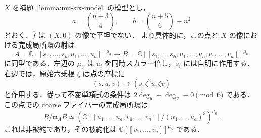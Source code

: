 \begin{theorem}
\label{thm:coarse-nonflat-degree-one}
$X$ を補題~\ref{lemma:mu-six-model} の模型とし，
\[
 a=\binom{n+3}{4},\qquad b=\binom{n+5}{6}-n^2
\]
とおく．$\overline f$ は $(X,0)$ の像で平坦でない．
より具体的に，この点と $X$ の像における完成局所環の射は
\begin{equation}
 A=\mathbb C[[s_1,\ldots,s_b,u_1,\ldots,u_a]]^{\mu_3}
 \longrightarrow
 B=\mathbb C[[s_1,\ldots,s_b,u_1,\ldots,u_a,v_1,\ldots,v_n]]^{\mu_6}
 \label{eq:coarse-nonflat-local}
\end{equation}
に同型である．左辺の $\mu_3$ は $u_i$ を同時スカラー倍し，$s_i$ には自明に作用する．
右辺では，原始六乗根 $\zeta$ は点の座標に
\[
 (s,u,v)\longmapsto(s,\zeta^2u,\zeta v)
\]
と作用する．従って不変単項式の条件は
$2\deg_u+\deg_v\equiv0\pmod6$ である．
この点での coarse ファイバーの完成局所環は
\begin{equation}
 B/\mathfrak m_A B
 \simeq\left(
 \mathbb C[[u_1,\ldots,u_a,v_1,\ldots,v_n]]/(u_1,\ldots,u_a)^3
 \right)^{\mu_6}.
 \label{eq:coarse-nilpotent-fiber}
\end{equation}
これは非被約であり，その被約化は $\mathbb C[[v_1,\ldots,v_n]]^{\mu_6}$ である．
\end{theorem}
